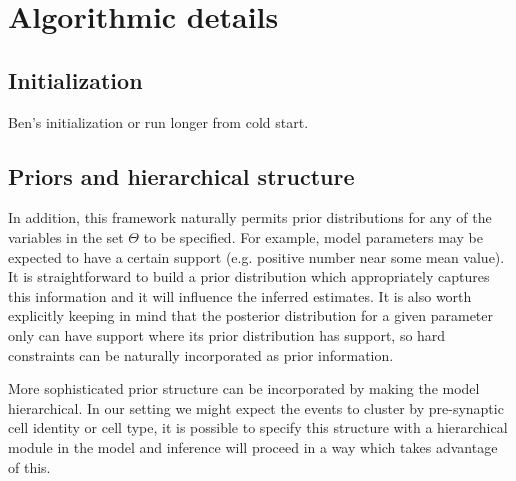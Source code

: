 \documentclass{article}
\begin{document}
\section*{Algorithmic details}

\subsection*{Initialization}

Ben's initialization or run longer from cold start.

\subsection*{Priors and hierarchical structure}

In addition, this framework naturally permits prior distributions for any of the variables in the set $\Theta$ to be specified.  For example, model parameters may be expected to have a certain support (e.g. positive number near some mean value).  It is straightforward to build a prior distribution which appropriately captures this information and it will influence the inferred estimates.  It is also worth explicitly keeping in mind that the posterior distribution for a given parameter only can have support where its prior distribution has support, so hard constraints can be naturally incorporated as prior information.

More sophisticated prior structure can be incorporated by making the model hierarchical.  In our setting we might expect the events to cluster by pre-synaptic cell identity or cell type, it is possible to specify this structure with a hierarchical module in the model and inference will proceed in a way which takes advantage of this.  


{}
\end{document}
